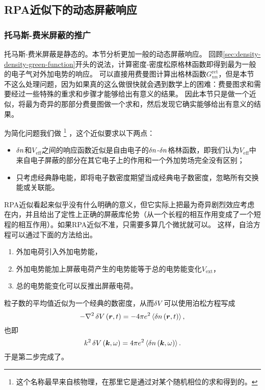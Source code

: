 \subsection{RPA近似下的动态屏蔽响应}\label{sec:rpa-semi-classical-dynamical}

\subsubsection{托马斯-费米屏蔽的推广}

托马斯-费米屏蔽是静态的。本节分析更加一般的动态屏蔽响应。
回顾\autoref{sec:density-density-green-function}开头的说法，计算密度-密度松原格林函数即得到最为一般的电子气对外加电势的响应。
可以直接用费曼图计算出格林函数$G^\text{ret}_{nn}$，但是本节不这么处理问题，因为如果真的这么做很快就会遇到数学上的困难：费曼图求和需要经过一些特殊的重求和步骤才能够给出有意义的结果。
因此本节只是做一个近似，将最为奇异的那部分费曼图做一个求和，然后发现它确实能够给出有意义的结果。

为简化问题我们做%
\footnote{这个名称最早来自核物理，在那里它是通过对某个随机相位的求和得到的。}%
，这个近似要求以下两点：
\begin{itemize}
    \item $\var{{n}}$和$V_\text{eff}$之间的响应函数近似是自由电子的$\var{{n}}$-$\var{{n}}$格林函数，即我们认为$V_\text{eff}$中来自电子屏蔽的部分在其它电子上的作用和一个外加势场完全没有区别；
    \item 只考虑经典静电能，即将电子数密度期望当成经典电子数密度，忽略所有交换能或关联能。
\end{itemize}
RPA近似看起来似乎没有什么明确的意义，但它实际上把最为奇异剧烈效应考虑在内，并且给出了定性上正确的屏蔽库伦势（从一个长程的相互作用变成了一个短程的相互作用）。如果RPA近似不准，只需要多算几个微扰就可以。
这样，自洽方程可以通过下面的方法给出。
\begin{enumerate}
    \item 外加电荷引入外加电势能，
    \item 外加电势能加上屏蔽电荷产生的电势能等于总的电势能变化$V_\text{ext}$，
    \item 总的电势能变化可以反推出屏蔽电荷。
\end{enumerate}

粒子数的平均值近似为一个经典的数密度，从而$\var{V}$可以使用泊松方程写成
\[
    - \laplacian \var{V}(\vb*{r}, t) = - 4\pi e^2 \expval*{\var{{n}}(\vb*{r}, t)},
\]
也即
\begin{equation}
    k^2 \var{V}(\vb*{k}, \omega) = 4\pi e^2 \expval*{\var{{n}}(\vb*{k}, \omega)}.
\end{equation}
于是第二步完成了。

